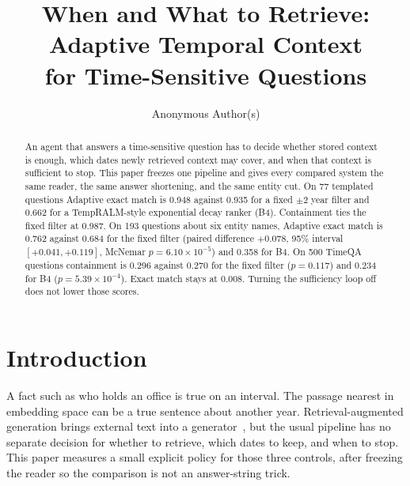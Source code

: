 \documentclass[sigconf,anonymous,review]{acmart}
\begin{document}
\title{When and What to Retrieve:\\Adaptive Temporal Context\\for Time-Sensitive Questions}

\author{Anonymous Author(s)}
\renewcommand{\shortauthors}{Anonymous Author(s)}

\begin{abstract}
An agent that answers a time-sensitive question has to decide whether stored context is enough, which dates newly retrieved context may cover, and when that context is sufficient to stop.
This paper freezes one pipeline and gives every compared system the same reader, the same answer shortening, and the same entity cut.
On 77 templated questions Adaptive exact match is 0.948 against 0.935 for a fixed $\pm 2$ year filter and 0.662 for a TempRALM-style exponential decay ranker (B4).
Containment ties the fixed filter at 0.987.
On 193 questions about six entity names, Adaptive exact match is 0.762 against 0.684 for the fixed filter (paired difference $+0.078$, 95\% interval $[+0.041,+0.119]$, McNemar $p=6.10\times 10^{-5}$) and 0.358 for B4.
On 500 TimeQA questions containment is 0.296 against 0.270 for the fixed filter ($p=0.117$) and 0.234 for B4 ($p=5.39\times 10^{-4}$).
Exact match stays at 0.008.
Turning the sufficiency loop off does not lower those scores.
\end{abstract}


\maketitle

\section{Introduction}

A fact such as who holds an office is true on an interval.
The passage nearest in embedding space can be a true sentence about another year.
Retrieval-augmented generation brings external text into a generator~\cite{lewis2020rag}, but the usual pipeline has no separate decision for whether to retrieve, which dates to keep, and when to stop.
This paper measures a small explicit policy for those three controls, after freezing the reader so the comparison is not an answer-string trick.
\end{document}
